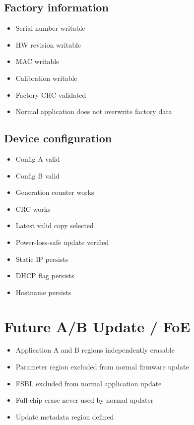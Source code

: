 \documentclass[10pt,a4paper,oneside]{report}
\providecommand{\tightlist}{\setlength{\itemsep}{1pt}\setlength{\parskip}{1pt}}
\begin{document}
\subsection{Factory information}\label{wiki-hardware-bring-up-and-testing--181-factory-information}

\begin{itemize}
\tightlist
\item[$\square$]
  Serial number writable
\item[$\square$]
  HW revision writable
\item[$\square$]
  MAC writable
\item[$\square$]
  Calibration writable
\item[$\square$]
  Factory CRC validated
\item[$\square$]
  Normal application does not overwrite factory data
\end{itemize}

\subsection{Device configuration}\label{wiki-hardware-bring-up-and-testing--182-device-configuration}

\begin{itemize}
\tightlist
\item[$\square$]
  Config A valid
\item[$\square$]
  Config B valid
\item[$\square$]
  Generation counter works
\item[$\square$]
  CRC works
\item[$\square$]
  Latest valid copy selected
\item[$\square$]
  Power-loss-safe update verified
\item[$\square$]
  Static IP persists
\item[$\square$]
  DHCP flag persists
\item[$\square$]
  Hostname persists
\end{itemize}

\section{Future A/B Update / FoE}\label{wiki-hardware-bring-up-and-testing--19-future-ab-update--foe}

\begin{itemize}
\tightlist
\item[$\square$]
  Application A and B regions independently erasable
\item[$\square$]
  Parameter region excluded from normal firmware update
\item[$\square$]
  FSBL excluded from normal application update
\item[$\square$]
  Full-chip erase never used by normal updater
\item[$\square$]
  Update metadata region defined
\end{itemize}
\end{document}

